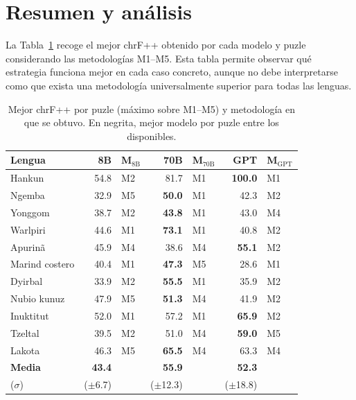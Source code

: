 \section{Resumen y análisis}
\label{sec:resultados_resumen}

La Tabla~\ref{tab:resumen_mejor} recoge el mejor chrF++ obtenido por cada modelo y puzle considerando las metodologías M1--M5. Esta tabla permite observar qué estrategia funciona mejor en cada caso concreto, aunque no debe interpretarse como que exista una metodología universalmente superior para todas las lenguas.

\begin{table}[H]
	\centering
	\caption{Mejor chrF++ por puzle (máximo sobre M1--M5) y metodología en que se obtuvo. En negrita, mejor modelo por puzle entre los disponibles.}
	\label{tab:resumen_mejor}
	{\fontsize{10pt}{11.5pt}\selectfont
		\begin{tabular*}{0.98\textwidth}{@{\extracolsep{\fill}} lrlrlrl}
			\toprule
			\textbf{Lengua}
			& \textbf{8B} & \textbf{M$_{\text{8B}}$}
			& \textbf{70B} & \textbf{M$_{\text{70B}}$}
			& \textbf{GPT} & \textbf{M$_{\text{GPT}}$} \\
			\midrule
			Hankun         & 54.8 & M2 & 81.7 & M1 & \textbf{100.0} & M1 \\
			Ngemba         & 32.9 & M5 & \textbf{50.0} & M1 & 42.3 & M2 \\
			Yonggom        & 38.7 & M2 & \textbf{43.8} & M1 & 43.0 & M4 \\
			Warlpiri       & 44.6 & M1 & \textbf{73.1} & M1 & 40.8 & M2 \\
			Apurinã        & 45.9 & M4 & 38.6 & M4 & \textbf{55.1} & M2 \\
			Marind costero & 40.4 & M1 & \textbf{47.3} & M5 & 28.6 & M1 \\
			Dyirbal        & 33.9 & M2 & \textbf{55.5} & M1 & 35.9 & M2 \\
			Nubio kunuz    & 47.9 & M5 & \textbf{51.3} & M4 & 41.9 & M2 \\
			Inuktitut      & 52.0 & M1 & 57.2 & M1 & \textbf{65.9} & M2 \\
			Tzeltal        & 39.5 & M2 & 51.0 & M4 & \textbf{59.0} & M5 \\
			Lakota         & 46.3 & M5 & \textbf{65.5} & M4 & 63.3 & M4 \\
			\midrule
			\textbf{Media} & \textbf{43.4} & & \textbf{55.9} & & \textbf{52.3} & \\
			($\sigma$)    & ($\pm$6.7) & & ($\pm$12.3) & & ($\pm$18.8) & \\
			\bottomrule
		\end{tabular*}
	}
\end{table}

